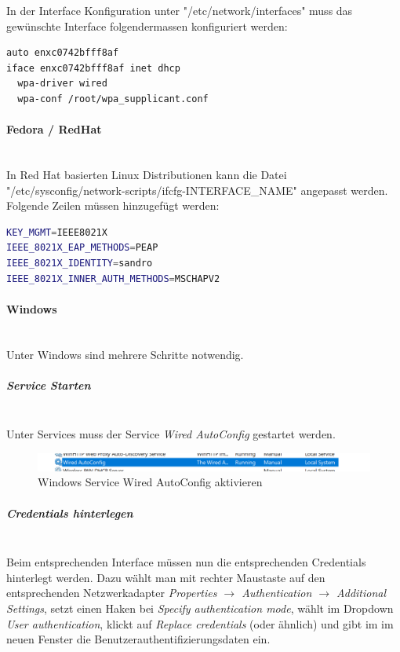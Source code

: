 In der Interface Konfiguration unter "/etc/network/interfaces" muss das gewünschte Interface folgendermassen konfiguriert werden:
\begin{lstlisting}[language=bash]
auto enxc0742bfff8af
iface enxc0742bfff8af inet dhcp
  wpa-driver wired
  wpa-conf /root/wpa_supplicant.conf
\end{lstlisting}

\paragraph{Fedora / RedHat}
~\\
In Red Hat basierten Linux Distributionen kann die Datei "/etc/sysconfig/network-scripts/ifcfg-INTERFACE\_NAME" angepasst werden. Folgende Zeilen müssen hinzugefügt werden:
\begin{lstlisting}[language=bash]
KEY_MGMT=IEEE8021X
IEEE_8021X_EAP_METHODS=PEAP
IEEE_8021X_IDENTITY=sandro
IEEE_8021X_INNER_AUTH_METHODS=MSCHAPV2
\end{lstlisting}

\paragraph{Windows}
~\\
Unter Windows sind mehrere Schritte notwendig. 

\subparagraph{Service Starten}
~\\
Unter Services muss der Service \textit{Wired AutoConfig} gestartet werden.

\begin{figure}[H]
	\centering
	\includegraphics[width=12cm]{img/8021x/8021x_1.png}
	\caption{Windows Service Wired AutoConfig aktivieren}
	\label{fig:windows-8021x-service}
\end{figure}

\subparagraph{Credentials hinterlegen}
~\\
Beim entsprechenden Interface müssen nun die entsprechenden Credentials hinterlegt werden.
Dazu wählt man mit rechter Maustaste auf den entsprechenden Netzwerkadapter \textit{Properties $\rightarrow$ Authentication $\rightarrow$ Additional Settings}, setzt einen Haken bei \textit{Specify authentication mode}, wählt im Dropdown \textit{User authentication}, klickt auf \textit{Replace credentials} (oder ähnlich) und gibt im im neuen Fenster die Benutzerauthentifizierungsdaten ein. 

